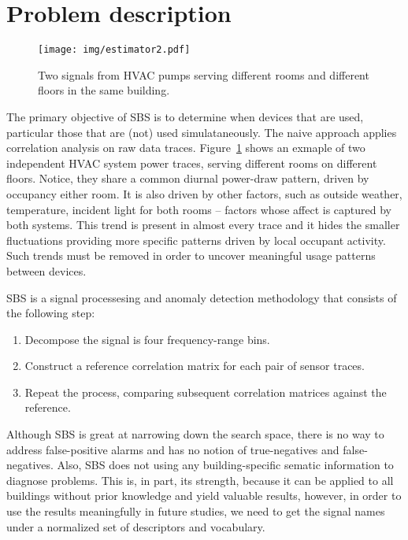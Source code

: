 
\section{Problem description}

\begin{figure}[t!]
 \texttt{[image: img/estimator2.pdf]}
 \caption{Two signals from HVAC pumps serving different rooms and different floors in the same building.}
 \label{fig:diagram1}
\end{figure}

The primary objective of SBS is to determine when devices that are used, particular those that are (not) used simulataneously.
The naive approach applies correlation analysis on raw data traces.  Figure~\ref{fig:diagram1} shows an exmaple of 
two independent HVAC system power traces, serving different rooms on different floors.  Notice, they share a common diurnal power-draw
pattern, driven by occupancy either room.  It is also driven by other factors, such as outside weather, temperature, incident light for
both rooms -- factors whose affect is captured by both systems.   
This trend is present in almost every trace and it hides 
the smaller fluctuations providing more specific patterns driven by local occupant activity.  
Such trends must be removed in order to uncover meaningful usage patterns between devices.

SBS is a signal processesing and anomaly detection methodology that consists of the following step:

\begin{enumerate}
\item Decompose the signal is four frequency-range bins.
\item Construct a reference correlation matrix for each pair of sensor traces.
\item Repeat the process, comparing subsequent correlation matrices against the reference.
\end{enumerate}

Although SBS is great at narrowing down the search space, there is no way to address false-positive alarms and
has no notion of true-negatives and false-negatives.  Also, SBS does not using any building-specific sematic information
to diagnose problems.  This is, in part, its strength, because it can be applied to all buildings without prior knowledge
and yield valuable results, however, in order to use the results meaningfully in future studies, we need to 
get the signal names under a normalized set of descriptors and vocabulary.
